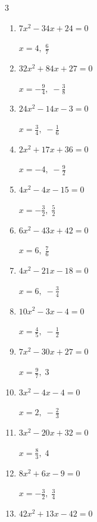\begin{multicols}{3}
\begin{enumerate}
        $\displaystyle x=-\frac{9}{7},\; \frac{9}{5}$

  \item $7x^{2}-34x+24=0$

        $\displaystyle x=4,\; \frac{6}{7}$

  \item $32x^{2}+84x+27=0$

        $\displaystyle x=-\frac{9}{4},\; -\frac{3}{8}$

  \item $24x^{2}-14x-3=0$

        $\displaystyle x=\frac{3}{4},\; -\frac{1}{6}$

  \item $2x^{2}+17x+36=0$

        $\displaystyle x=-4,\; -\frac{9}{2}$

  \item $4x^{2}-4x-15=0$

        $\displaystyle x=-\frac{3}{2},\; \frac{5}{2}$

  \item $6x^{2}-43x+42=0$

        $\displaystyle x=6,\; \frac{7}{6}$

  \item $4x^{2}-21x-18=0$

        $\displaystyle x=6,\; -\frac{3}{4}$

\columnbreak %

  \item $10x^{2}-3x-4=0$

        $\displaystyle x=\frac{4}{5},\; -\frac{1}{2}$

  \item $7x^{2}-30x+27=0$

        $\displaystyle x=\frac{9}{7},\; 3$

  \item $3x^{2}-4x-4=0$

        $\displaystyle x=2,\; -\frac{2}{3}$

  \item $3x^{2}-20x+32=0$

        $\displaystyle x=\frac{8}{3},\; 4$

  \item $8x^{2}+6x-9=0$

        $\displaystyle x=-\frac{3}{2},\; \frac{3}{4}$

  \item $42x^{2}+13x-42=0$


\end{enumerate}
\end{multicols}
